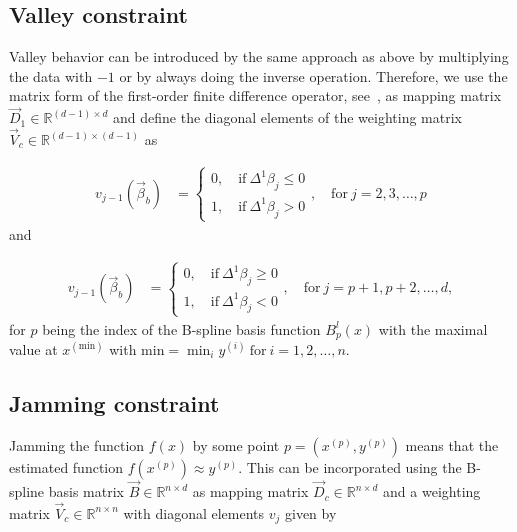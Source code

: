 \subsection{Valley constraint} \label{subsec:ValleyC}

Valley behavior can be introduced by the same approach as above by multiplying the data with $-1$ or by always doing the inverse operation. Therefore, we use the matrix form of the first-order finite difference operator, see~, as mapping matrix $\vec{D}_1 \in \mathbb{R}^{(d-1) \times d}$ and define the diagonal elements of the weighting matrix $\vec{V}_c \in \mathbb{R}^{(d-1) \times (d-1)}$ as

\begin{align}\label{eq:v_valley_1}
	v_{j-1}(\vec{\beta}_b) &= \begin{cases} 
		0, \quad \text{if} \ \Delta^1\beta_j \le 0 \\ 
		1, \quad \text{if} \ \Delta^1\beta_j > 0
	\end{cases}, \quad \text{for} \ j=2,3,\dots,p
\end{align}
%
and 

\begin{align}\label{eq:v_valley_2}
	v_{j-1}(\vec{\beta}_b) &= \begin{cases} 
		0, \quad \text{if} \ \Delta^1\beta_j \ge 0 \\ 
		1, \quad \text{if} \ \Delta^1\beta_j < 0
	\end{cases}, \quad \text{for} \  j=p+1,p+2,\dots,d,
\end{align}
%
for $p$ being the index of the B-spline basis function $B_p^l(x)$ with the maximal value at $x^{(\text{min})}$ with $\text{min} = \min_i y^{(i)} \ \text{for} \ i=1,2,\dots,n$. 

\subsection{Jamming constraint} \label{subsec:JammC}

Jamming the function $f(x)$ by some point $p = (x^{(p)}, y^{(p)})$ means that the estimated function $f(x^{(p)}) \approx y^{(p)}$. This can be incorporated using the B-spline basis matrix $\vec{B} \in \mathbb{R}^{n \times d}$ as mapping matrix $\vec{D}_c \in \mathbb{R}^{n \times d}$ and a weighting matrix $\vec{V}_c \in \mathbb{R}^{n \times n}$ with diagonal elements $v_j$ given by

